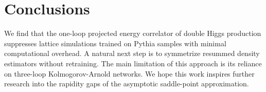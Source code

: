 \section{Conclusions}\label{sec:conclusions}

We find that the one-loop projected energy correlator of double Higgs
production suppresses lattice simulations trained on Pythia samples with
minimal computational overhead. A natural next step is to symmetrize
resummed density estimators without retraining. The main limitation of
this approach is its reliance on three-loop Kolmogorov-Arnold networks.
We hope this work inspires further research into the rapidity gaps of
the asymptotic saddle-point approximation.


